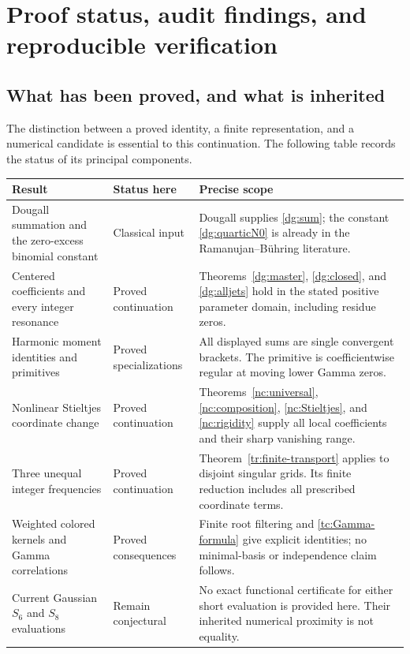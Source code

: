 \documentclass[11pt,a4paper]{article}
\numberwithin{equation}{section}
\theoremstyle{definition}
\theoremstyle{remark}
\begin{document}

\section{Proof status, audit findings, and reproducible verification}
\label{sec:audit}

\subsection{What has been proved, and what is inherited}
The distinction between a proved identity, a finite representation,
and a numerical candidate is essential to this continuation. The
following table records the status of its principal components.

\begin{longtable}{@{}>{\raggedright\arraybackslash}p{.26\linewidth}
>{\raggedright\arraybackslash}p{.19\linewidth}
>{\raggedright\arraybackslash}p{.49\linewidth}@{}}
\toprule
Result & Status here & Precise scope\\
\midrule
\endhead
Dougall summation and the zero-excess binomial constant &
Classical input &
Dougall supplies \eqref{dg:sum}; the constant
\eqref{dg:quarticN0} is already in the Ramanujan--B\"uhring literature.\\
\addlinespace
Centered coefficients and every integer resonance &
Proved continuation &
Theorems~\ref{dg:master}, \ref{dg:closed}, and \ref{dg:alljets}
hold in the stated positive parameter domain, including residue zeros.\\
\addlinespace
Harmonic moment identities and primitives &
Proved specializations &
All displayed sums are single convergent brackets. The primitive is
coefficientwise regular at moving lower Gamma zeros.\\
\addlinespace
Nonlinear Stieltjes coordinate change &
Proved continuation &
Theorems~\ref{nc:universal}, \ref{nc:composition},
\ref{nc:Stieltjes}, and \ref{nc:rigidity} supply all local coefficients
and their sharp vanishing range.\\
\addlinespace
Three unequal integer frequencies &
Proved continuation &
Theorem~\ref{tr:finite-transport} applies to disjoint singular grids.
Its finite reduction includes all prescribed coordinate terms.\\
\addlinespace
Weighted colored kernels and Gamma correlations &
Proved consequences &
Finite root filtering and \eqref{tc:Gamma-formula} give explicit
identities; no minimal-basis or independence claim follows.\\
\addlinespace
Current Gaussian $S_6$ and $S_8$ evaluations &
Remain conjectural &
No exact functional certificate for either short evaluation is
provided here. Their inherited numerical proximity is not equality.\\
\bottomrule
\end{longtable}
\end{document}
